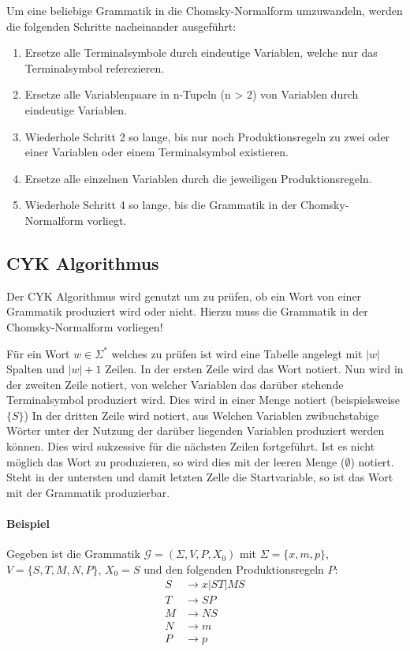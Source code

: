 Um eine beliebige Grammatik in die Chomsky-Normalform umzuwandeln, werden die folgenden Schritte nacheinander ausgeführt:
\begin{enumerate}
	\item Ersetze alle Terminalsymbole durch eindeutige Variablen, welche nur das Terminalsymbol referezieren.
	\item Ersetze alle Variablenpaare in n-Tupeln (n > 2) von Variablen durch eindeutige Variablen.
	\item Wiederhole Schritt 2 so lange, bis nur noch Produktionsregeln zu zwei oder einer Variablen oder einem Terminalsymbol existieren.
	\item Ersetze alle einzelnen Variablen durch die jeweiligen Produktionsregeln.
	\item Wiederhole Schritt 4 so lange, bis die Grammatik in der Chomsky-Normalform vorliegt.
\end{enumerate}


\subsection{CYK Algorithmus}
Der CYK Algorithmus wird genutzt um zu prüfen, ob ein Wort von einer Grammatik produziert wird oder nicht. Hierzu muss die Grammatik in der Chomsky-Normalform vorliegen!

Für ein Wort $ w \in \Sigma ^ * $ welches zu prüfen ist wird eine Tabelle angelegt mit $ \vert w \vert $ Spalten und $ \vert w \vert + 1 $ Zeilen. In der ersten Zeile wird das Wort notiert. Nun wird in der zweiten Zeile notiert, von welcher Variablen das darüber stehende Terminalsymbol produziert wird. Dies wird in einer Menge notiert (beispielsweise $ \{ S \} $) In der dritten Zeile wird notiert, aus Welchen Variablen zwibuchstabige Wörter unter der Nutzung der darüber liegenden Variablen produziert werden können. Dies wird sukzessive für die nächsten Zeilen fortgeführt. Ist es nicht möglich das Wort zu produzieren, so wird dies mit der leeren Menge ($ \emptyset $) notiert. Steht in der untersten und damit letzten Zelle die Startvariable, so ist das Wort mit der Grammatik produzierbar.

\paragraph{Beispiel}
Gegeben ist die Grammatik $ \mathcal{G} = (\Sigma, V, P, X _ 0) $ mit $ \Sigma = \{ x, m, p \} $, $ V = \{ S, T, M, N, P \} $, $ X _ 0 = S $ und den folgenden Produktionsregeln $ P $:
\begin{equation*}
	\begin{split}
		S & \rightarrow x | ST | MS \\
		T & \rightarrow SP          \\
		M & \rightarrow NS          \\
		N & \rightarrow m           \\
		P & \rightarrow p           \\
	\end{split}
\end{equation*}

